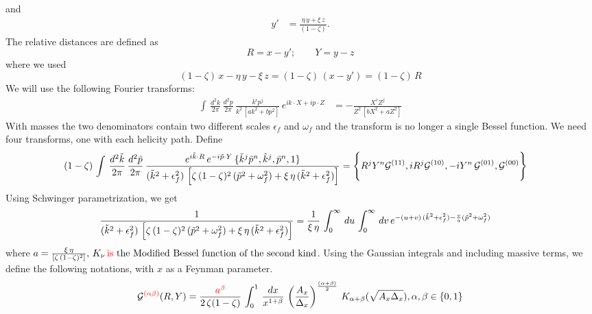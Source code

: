 \documentclass[9pt]{article}
\newcommand{\chg}[1]{{\color{red}#1}}
\numberwithin{equation}{section}
\begin{document}
\begin{enumerate}
\begin{align}
\end{align}
and 
\begin{align}
    y' & = \frac{\eta\,y + \xi\,z}{(1-\zeta)}.
\end{align}
The relative distances are defined as 
$$R = x - y'; \hspace{2em} Y = y-z$$
where we used 
$$(1-\zeta)\,x - \eta\,y -\xi\,z = (1-\zeta)\, (x-y') = (1-\zeta)\,R$$
We will use the following Fourier transforms:
\begin{align}
    \int\, \frac{d^{2}k}{2\pi}\, \frac{d^{2}p}{2\pi}\, \frac{k^{i}p^{j}}{k^{2}\, \left[ak^{2}+bp^{2}\right]}\,e^{ik\cdot X + ip\cdot Z} & = -\frac{X^{i}Z^{j}}{Z^{2}\,\left[bX^{2}+aZ^{2}\right]}
\end{align}
With masses the two denominators contain two different scales $\epsilon_{f}$ and $\omega_{f}$ \label{chg:ty1}\chg{and} the transform is no longer a single Bessel function. We need four transforms, one with each helicity path. Define
\begin{align}
    (1-\zeta)\, \int\, \frac{d^{2}\Tilde{k}}{2\pi}\, \frac{d^{2}\Tilde{p}}{2\pi}\, \frac{e^{i\Tilde{k}\cdot R}\, e^{-i\Tilde{p}\cdot Y}\, \{\Tilde{k}^{j}\Tilde{p}^{n}, \Tilde{k}^{j}, \Tilde{p}^{n}, 1\}}{(\Tilde{k}^{2}+\epsilon^{2}_{f})\, \left[\zeta\,(1-\zeta)^{2}\, (\Tilde{p}^{2}+\omega_{f}^{2}) + \xi\,\eta\,(\Tilde{k}^{2} + \epsilon^{2}_{f})\right]} & = \Bigg\{R^{j}Y^{n}\mathcal{G}^{(11)}, iR^{j}\mathcal{G}^{(10)}, -iY^{n}\,\mathcal{G}^{(01)}, \mathcal{G}^{(00)}\Bigg\}
\end{align}
Using Schwinger parametrization, we get
\begin{align}
    \frac{1}{(\Tilde{k}^{2}+\epsilon^{2}_{f})\,\left[\zeta\,(1-\zeta)^{2}\, (\Tilde{p}^{2}+\omega_{f}^{2}) + \xi\,\eta\,(\Tilde{k}^{2} + \epsilon^{2}_{f})\right]} & = \frac{1}{\xi\,\eta}\, \int_{0}^{\infty}\, du \, \int_{0}^{\infty}\, dv\, e^{-(u+v)\, (\Tilde{k}^{2}+\epsilon^{2}_{f})-\frac{v}{a}(\Tilde{p}^{2}+\omega^{2}_{f})}
\end{align}
where $a = \frac{\xi\, \eta}{\left[\zeta\,(1-\zeta)^{2}\right]},\, K_{\nu}\, \label{chg:ty2}\text{\chg{is} the Modified Bessel function of the second kind}$. Using the Gaussian integrals and including massive terms, we define the following notations, with $x$ as a Feynman parameter.
\label{chg:abetaa}$$\mathcal{G}^{\chg{(\alpha\beta)}}(R,Y) = \frac{\chg{a^{\beta}}}{2\,\zeta(1-\zeta)}\,\int_{0}^{1}\, \frac{dx}{x^{1+\beta}}\, \left(\frac{A_{x}}{\Delta_{x}}\right)^{\frac{(\alpha + \beta)}{2}}\,K_{\alpha + \beta} (\sqrt{A_{x}\Delta_{x}}), \alpha, \beta \in \{0,1\}$$

\end{enumerate}
\end{document}
